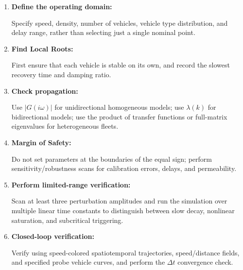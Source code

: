 \documentclass[11pt,a4paper,openany]{book}
\numberwithin{equation}{chapter}
\numberwithin{figure}{chapter}
\numberwithin{table}{chapter}
\begin{document}
\begin{tcolorbox}[keybox,title=\textbf{Recommended Engineering Workflow}]
\begin{enumerate}[leftmargin=1.6em,itemsep=4pt]
\item \textbf{Define the operating domain:}




Specify speed, density, number of vehicles, vehicle type distribution, and delay range, rather than selecting just a single nominal point.







\item \textbf{Find Local Roots:}




First ensure that each vehicle is stable on its own, and record the slowest recovery time and damping ratio.







\item \textbf{Check propagation:}




Use $|G(i\omega)|$ for unidirectional homogeneous models; use $\lambda(k)$ for bidirectional models; use the product of transfer functions or full-matrix eigenvalues for heterogeneous fleets.


\item \textbf{Margin of Safety:}




Do not set parameters at the boundaries of the equal sign; perform sensitivity/robustness scans for calibration errors, delays, and permeability.







\item \textbf{Perform limited-range verification:}




Scan at least three perturbation amplitudes and run the simulation over multiple linear time constants to distinguish between slow decay, nonlinear saturation, and subcritical triggering.







\item \textbf{Closed-loop verification:}




Verify using speed-colored spatiotemporal trajectories, speed/distance fields, and specified probe vehicle curves, and perform the $\Delta t$ convergence check.







\end{enumerate}
\end{tcolorbox}
\end{document}
